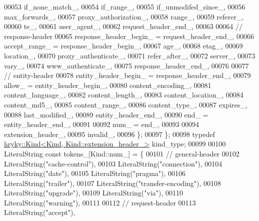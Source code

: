 \begin{DoxyCode}
00053             if\_none\_match\_,
00054             if\_range\_,
00055             if\_unmodifed\_since\_,
00056             max\_forwards\_,
00057             proxy\_authorization\_,
00058             range\_,
00059             referer\_,
00060             te\_,
00061             user\_agent\_,
00062             request\_header\_end\_,
00063 
00064             \textcolor{comment}{// response-header}
00065             response\_header\_begin\_  = request\_header\_end\_,
00066             accept\_range\_           = response\_header\_begin\_,
00067             age\_,
00068             etag\_,
00069             location\_,
00070             proxy\_authenticate\_,
00071             refer\_after\_,
00072             server\_,
00073             vary\_,
00074             www\_authenticate\_,
00075             response\_header\_end\_,
00076 
00077             \textcolor{comment}{// entity-header}
00078             entity\_header\_begin\_    = response\_header\_end\_,
00079             allow\_                  = entity\_header\_begin\_,
00080             content\_encoding\_,
00081             content\_language\_,
00082             content\_length\_,
00083             content\_location\_,
00084             content\_md5\_,
00085             content\_range\_,
00086             content\_type\_,
00087             expires\_,
00088             last\_modified\_,
00089             entity\_header\_end\_,
00090             end\_                    = entity\_header\_end\_,
00091 
00092             num\_                    = end\_,
00093 
00094             extension\_header\_,
00095             invalid\_,
00096         \};
00097     \};
00098     \textcolor{keyword}{typedef} \hyperlink{classhryky_1_1_kind}{hryky::Kind<Kind, Kind::extension_header_>} kind\_type;
00099 
00100     LiteralString \textcolor{keyword}{const} tokens\_[Kind::num\_] = \{
00101         \textcolor{comment}{// general-header}
00102         LiteralString(\textcolor{stringliteral}{"cache-control"}),
00103         LiteralString(\textcolor{stringliteral}{"connection"}),
00104         LiteralString(\textcolor{stringliteral}{"date"}),
00105         LiteralString(\textcolor{stringliteral}{"pragma"}),
00106         LiteralString(\textcolor{stringliteral}{"trailer"}),
00107         LiteralString(\textcolor{stringliteral}{"transfer-encoding"}),
00108         LiteralString(\textcolor{stringliteral}{"upgrade"}),
00109         LiteralString(\textcolor{stringliteral}{"via"}),
00110         LiteralString(\textcolor{stringliteral}{"warning"}),
00111 
00112         \textcolor{comment}{// request-header}
00113         LiteralString(\textcolor{stringliteral}{"accept"}),

\end{DoxyCode}
